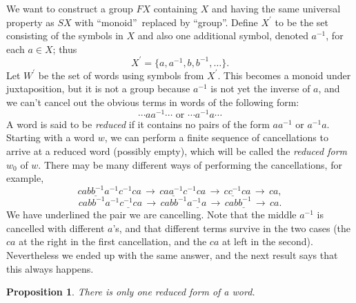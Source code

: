 \documentclass[a4paper,11pt,final,openany]{memoir}%
\newtheorem{proposition}[X]{Proposition}
\theoremstyle{nonumberplain}
\begin{document}
We want to construct a group $FX$ containing $X$ and having the same universal
property as $SX$ with \textquotedblleft monoid\textquotedblright\ replaced by
\textquotedblleft group\textquotedblright. Define $X^{\prime}$ to be the set
consisting of the symbols in $X$ and also one additional symbol, denoted
$a^{-1}$, for each $a\in X$; thus
\[
X^{\prime}=\{a,a^{-1},b,b^{-1},\ldots\}.
\]
Let $W^{\prime}$ be the set of words using symbols from $X^{\prime}$. This
becomes a monoid under juxtaposition, but it is not a group because $a^{-1}$
is not yet the inverse of $a$, and we can't cancel out the obvious terms in
words of the following form:
\[
\cdots aa^{-1}\cdots\text{ or }\cdots a^{-1}a\cdots
\]
A word is said to be \emph{reduced}%
%
\emph{\/} if it contains no pairs of the form $aa^{-1}$ or $a^{-1}a$. Starting
with a word $w$, we can perform a finite sequence of cancellations to arrive
at a reduced word (possibly empty), which will be called the \emph{reduced
form\/}%
$w_{0}$ of $w$. There may be many different ways of performing the
cancellations, for example,
\[
ca\underline{bb^{-1}}a^{-1}c^{-1}ca\,\rightarrow\,c\underline{aa^{-1}}%
c^{-1}ca\,\rightarrow\,\underline{cc^{-1}}ca\,\rightarrow\,ca,
\]%
\[
cabb^{-1}a^{-1}\underline{c^{-1}c}a\,\rightarrow\,cabb^{-1}\underline{a^{-1}%
a\,}\rightarrow\,ca\underline{bb^{-1}\,}\rightarrow\,ca.
\]
We have underlined the pair we are cancelling. Note that the middle $a^{-1}$
is cancelled with different $a$'s, and that different terms survive in the two
cases (the $ca$ at the right in the first cancellation, and the $ca$ at left
in the second). Nevertheless we ended up with the same answer, and the next
result says that this always happens.

\begin{proposition}
\label{fg01} There is only one reduced form of a word.
\end{proposition}
\end{document}

